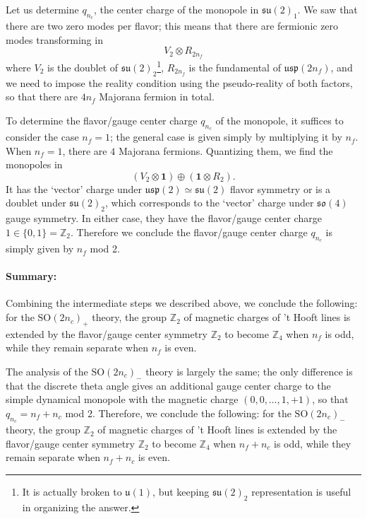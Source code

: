 \documentclass[12pt]{article}
\numberwithin{equation}{section}
\def\bZ{\mathbb{Z}}
\def\SO{\mathrm{SO}}
\def\u{\mathfrak{u}}
\def\su{\mathfrak{su}}
\def\so{\mathfrak{so}}
\def\usp{\mathfrak{usp}}
\begin{document}
Let us determine $q_{n_c}$, the center charge of the monopole in $\su(2)_1$.
We saw that there are two zero modes per flavor; 
this means that there are fermionic zero modes transforming in \begin{equation}
V_{2} \otimes R_{2n_f} 
\end{equation} where $V_2$ is the doublet of $\su(2)_2$\footnote{
	It is actually broken to $\u(1)$, but keeping $\su(2)_2$ representation is useful in organizing the answer.
}, 
$R_{2n_f}$ is the fundamental of $\usp(2n_f)$,
and we need to impose the reality condition using the pseudo-reality of both factors,
so that there are $4n_f$ Majorana fermion in total.

To determine the flavor/gauge center charge $q_{n_c}$ of the monopole,
it suffices to consider the case $n_f=1$;
the general case is given simply by multiplying it by $n_f$.
When $n_f=1$, there are $4$ Majorana fermions.
Quantizing them, we find the monopoles in \begin{equation}
(V_2 \otimes \mathbf{1}) \oplus (\mathbf{1}\otimes R_2).
\end{equation}
It has the `vector' charge under $\usp(2)\simeq\su(2)$ flavor symmetry or is a doublet under $\su(2)_2$,
which corresponds to the `vector' charge under $\so(4)$ gauge symmetry.
In either case, they have the flavor/gauge center charge $1 \in \{0,1\}=\bZ_2$.
Therefore we conclude the flavor/gauge center charge $q_{n_c}$ is simply given by $n_f$ mod 2.

\paragraph{Summary:}
Combining the intermediate steps we described above, we conclude the following: 
for the $\SO(2n_c)_+$ theory,
the group $\bZ_2$ of magnetic charges of 't Hooft lines is extended by the flavor/gauge center symmetry $\bZ_2$ to become $\bZ_4$ when $n_f$ is odd,
while they remain separate when $n_f$ is even.

The analysis of the $\SO(2n_c)_-$ theory is largely the same;
the only difference is that the discrete theta angle gives an additional gauge center charge to the simple dynamical monopole with the magnetic charge $(0,0,\ldots,1,+1)$, so that $q_{n_c}=n_f+n_c$ mod 2.
Therefore, we conclude the following:
for the $\SO(2n_c)_-$ theory,
the group $\bZ_2$ of magnetic charges of 't Hooft lines is extended by the flavor/gauge center symmetry $\bZ_2$ to become $\bZ_4$ when $n_f+n_c$ is odd,
while they remain separate when $n_f+n_c$ is even.
\end{document}
